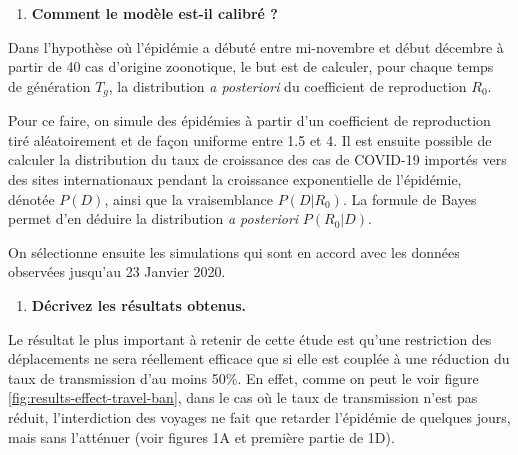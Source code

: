 \documentclass[12pt, a4paper]{article}
\begin{document}
\begin{enumerate}[resume]
\item \textbf{Comment le modèle est-il calibré ?}
\end{enumerate}

Dans l'hypothèse où l'épidémie a débuté entre mi-novembre et début décembre à partir de 40 cas d'origine zoonotique, le but est de calculer, pour chaque temps de génération $T_g$, la distribution \textit{a posteriori} du coefficient de reproduction $R_0$.

Pour ce faire, on simule des épidémies à partir d'un coefficient de reproduction tiré aléatoirement et de façon uniforme entre 1.5 et 4. Il est ensuite possible de calculer la distribution du taux de croissance des cas de COVID-19 importés vers des sites internationaux pendant la croissance exponentielle de l'épidémie, dénotée $P(D)$, ainsi que la vraisemblance $P(D|R_0)$. La formule de Bayes permet d'en déduire la distribution \textit{a posteriori} $P(R_0|D)$.

On sélectionne ensuite les simulations qui sont en accord avec les données observées jusqu'au 23 Janvier 2020.

\begin{enumerate}[resume]
\item \textbf{Décrivez les résultats obtenus.}
\end{enumerate}

Le résultat le plus important à retenir de cette étude est qu'une restriction des déplacements ne sera réellement efficace que si elle est couplée à une réduction du taux de transmission d'au moins 50\%. En effet, comme on peut le voir figure \ref{fig:results-effect-travel-ban}, dans le cas où le taux de transmission n'est pas réduit, l'interdiction des voyages ne fait que retarder l'épidémie de quelques jours, mais sans l'atténuer (voir figures 1A et première partie de 1D). \\
\end{document}
